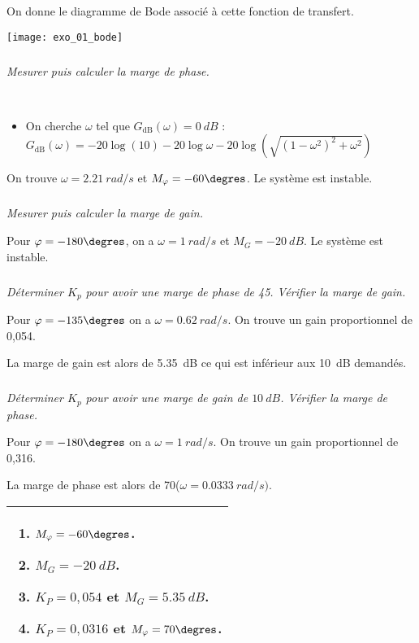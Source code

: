 \begin{multicols}{2}
On donne le diagramme de Bode associé à cette fonction de transfert. 
\begin{center}
\texttt{[image: exo\_01\_bode]}
\end{center}


\subparagraph{}\textit{Mesurer puis calculer la marge de phase.}
\ifprof
\begin{corrige}~\\
\begin{itemize}
\item On cherche $\omega$ tel que $G_{\text{dB}}(\omega)=\SI{0}{dB}$  :
$G_{\text{dB}}(\omega)=-20\log(10) -20\log\omega-20\log\left(\sqrt{(1-\omega^2)^2+\omega^2}\right)$
\end{itemize}

On trouve $\omega=\SI{2,21}{rad/s}$ et $M_{\varphi}=-60\degres$. Le système est instable.
\end{corrige}
\else
\fi

\subparagraph{}\textit{Mesurer puis calculer la marge de gain.}
\ifprof
\begin{corrige}
Pour $\varphi=-180\degres$, on a $\omega=\SI{1}{rad/s}$ et $M_{G}=\SI{-20}{dB}$. Le système est instable.
\end{corrige}
\else
\fi

\subparagraph{}\textit{Déterminer $K_p$ pour avoir une marge de phase de 45\degres. Vérifier la marge de gain. }
\ifprof
\begin{corrige}
Pour $\varphi=-135\degres$ on a $\omega=\SI{0,62}{rad/s}$. On trouve un gain proportionnel de 0,054.

La marge de gain est alors de \SI{5,35}{dB} ce qui est inférieur aux \SI{10}{dB} demandés.
\end{corrige}
\else
\fi

\subparagraph{}\textit{Déterminer $K_p$ pour avoir une marge de gain de $\SI{10}{dB}$. Vérifier la marge de phase. }
\ifprof
\begin{corrige}
Pour $\varphi=-180\degres$ on a $\omega=\SI{1}{rad/s}$. On trouve un gain proportionnel de 0,316.

La marge de phase est alors de 70\degres ($\omega=\SI{0,0333}{rad/s})$.
\end{corrige}
\else
\fi


\ifcolle
\else
\ifprof 
\else
\noindent
\begin{tabular}{|p{.9\linewidth}|}
\hline
\begin{enumerate}
\item $M_{\varphi}=-60\degres$.
\item $M_G=\SI{-20}{dB}$.
\item $K_P=0,054$ et $M_{G}=\SI{5,35}{dB}$.
\item $K_P=0,0316$ et $M_{\varphi}=70\degres$.
\end{enumerate}\\
\hline
\end{tabular}
\fi
\fi


\end{multicols}
